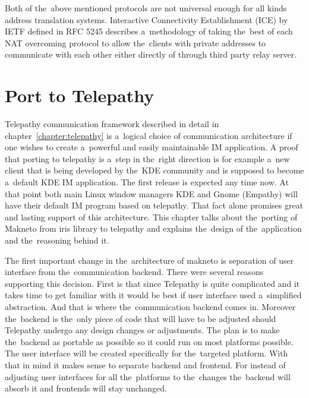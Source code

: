 Both of the~above mentioned protocols are not universal enough for all kinds address translation systems. Interactive Connectivity Establishment (ICE) by IETF defined in RFC 5245 describes a~methodology of taking the~best of each NAT overcoming protocol to allow the~clients with private addresses to communicate with each other either directly of through third party relay server.  


\chapter{Port to Telepathy}\label{chapter:port-to-telepathy}
Telepathy communication framework described in detail in chapter~\ref{chapter:telepathy} is a~logical choice of communication architecture if one wishes to create a~powerful and easily maintainable IM application. A proof that porting to telepathy is a~step in the~right direction is for example a~new client that is being developed by the~KDE community and is supposed to become a~default KDE IM application. The first release is expected any time now. At that point both main Linux window managers KDE and Gnome (Empathy) will have their default IM program based on telepathy. That fact alone promises great and lasting support of this architecture. This chapter talks about the~porting of Makneto from iris library to telepathy and explains the~design of the~application and the~reasoning behind it.

The first important change in the~architecture of makneto is separation of user interface from the~communication backend. There were several reasons supporting this decision. First is that since Telepathy is quite complicated and it takes time to get familiar with it would be best if user interface used a~simplified abstraction. And that is where the~communication backend comes in. Moreover the~backend is the~only piece of code that will have to be adjusted should Telepathy undergo any design changes or adjustments. The plan is to make the~backend as portable as possible so it could run on most platforms possible. The user interface will be created specifically for the~targeted platform. With that in mind it makes sense to separate backend and frontend. For instead of adjusting user interfaces for all the~platforms to the~changes the~backend will absorb it and frontends will stay unchanged. 

